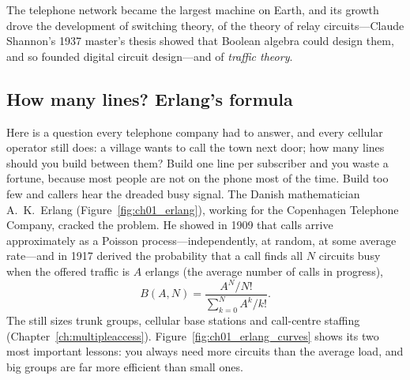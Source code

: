 The telephone network became the largest machine on Earth, and its growth drove the development of
switching theory, of the theory of relay circuits---Claude Shannon's 1937 master's thesis showed that
Boolean algebra could design them, and so founded digital circuit design---and of \emph{traffic
theory}.

\subsection{How many lines? Erlang's formula}


Here is a question every telephone company had to answer, and every cellular operator still does: a
village wants to call the town next door; how many lines should you build between them? Build one
line per subscriber and you waste a fortune, because most people are not on the phone most of the
time. Build too few and callers hear the dreaded busy signal. The Danish mathematician A.~K.~Erlang
(Figure~\ref{fig:ch01_erlang}), working for the Copenhagen Telephone Company, cracked the problem. He
showed in 1909 that calls arrive approximately as a Poisson process---independently, at random, at
some average rate---and in 1917 derived the probability that a call finds all $N$ circuits busy when
the offered traffic is $A$ erlangs (the average number of calls in progress),
\begin{equation}
B(A,N) = \frac{A^N/N!}{\sum_{k=0}^{N} A^k/k!}.
\label{eq:ch01:erlangb}
\end{equation}
The  still sizes trunk groups, cellular base stations and call-centre staffing
(Chapter~\ref{ch:multipleaccess}). Figure~\ref{fig:ch01_erlang_curves} shows its two most important
lessons: you always need more circuits than the average load, and big groups are far more efficient
than small ones.


